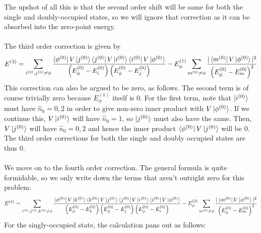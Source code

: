 \documentclass[twoside]{report}
\numberwithin{equation}{section}
\begin{document}
The upshot of all this is that the second order shift will be same for both the single and doubly-occupied states, so we will ignore that correction as it can be absorbed into the zero-point energy.
\\\\The third order correction is given by
\begin{equation}\begin{aligned}
	E^{(3)} = \sum_{i^{(0)}, j^{(0)}\neq\phi}\frac{\bra{\phi^{(0)}}V\ket{j^{(0)}}\bra{j^{(0)}}V\ket{i^{(0)}}\bra{i^{(0)}}V\ket{\phi^{(0)}}}{\left(E^{(0)}_\phi - E^{(0)}_i\right)\left(E^{(0)}_\phi - E^{(0)}_j\right)} - E_\phi^{(1)}\sum_{m^{(0)}\neq\phi}\frac{|\bra{m^{(0)}}V\ket{\phi^{(0)}}|^2}{\left(E^{(0)}_\phi - E^{(0)}_m\right)^2}
\end{aligned}\end{equation}
This correction can also be argued to be zero, as follows. The second term is of course trivially zero because \(E_\phi^{(1)}\) itself is 0. For the first term, note that \(\ket{i^{(0)}}\) must have \(\hat n_0 = 0,2\) in order to give non-zero inner product with \(V\ket{\phi^{(0)}}\). If we continue this, \(V\ket{i^{(0)}}\) will have \(\hat n_0 = 1\), so \(\ket{j^{(0)}}\) must also have the same. Then, \(V\ket{j^{(0)}}\) will have \(\hat n_0 = 0, 2\) and hence the inner product \(\bra{\phi^{(0)}}V\ket{j^{(0)}}\) will be 0. The third order corrections for both the single and doubly occupied states are thus 0.
\\\\We move on to the fourth order correction. The general formula is quite formidable, so we only write down the terms that aren't outright zero for this problem:
\begin{equation}\begin{aligned}
	E^{(4)} = \sum_{i^{(0)}, j^{(0)}, k^{(0)}\neq\phi}\frac{\bra{\phi^{(0)}}V\ket{k^{(0)}}\bra{k^{(0)}}V\ket{j^{(0)}}\bra{j^{(0)}}V\ket{i^{(0)}}\bra{i^{(0)}}V\ket{\phi^{(0)}}}{\left(E^{(0)}_\phi - E^{(0)}_k\right)\left(E^{(0)}_\phi - E^{(0)}_j\right)\left(E^{(0)}_\phi - E^{(0)}_i\right)} - E_\phi^{(2)}\sum_{m^{(0)}\neq\phi}\frac{|\bra{m^{(0)}}V\ket{\phi^{(0)}}|^2}{\left(E^{(0)}_\phi - E^{(0)}_m\right)^2}
\end{aligned}\end{equation}
For the singly-occupied state, the calculation pans out as follows:
\end{document}
